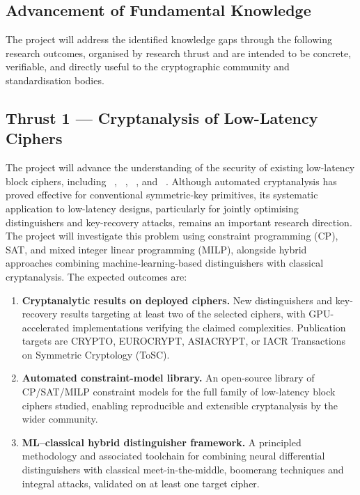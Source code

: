 \subsection{Advancement of Fundamental Knowledge}
The project will address the identified knowledge gaps through the following research outcomes, organised by research thrust and are intended to be concrete, verifiable, and directly useful to the cryptographic community and standardisation bodies.

\subsection*{Thrust 1 — Cryptanalysis of Low-Latency Ciphers}
The project will advance the understanding of the security of existing low-latency block ciphers, including ~\cite{cryptoeprint:2024/1240}, ~\cite{DBLP:conf/eurocrypt/BelkheyarDGLMPRSSAV25}, ~\cite{DBLP:conf/uss/CanaleGLTTU23}, and ~\cite{DBLP:journals/tosc/AvanziBDEGNR23}.
Although automated cryptanalysis has proved effective for conventional symmetric-key primitives, its systematic application to low-latency designs, particularly for jointly optimising distinguishers and key-recovery attacks, remains an important research direction. The project will investigate this problem using constraint programming (CP), SAT, and mixed integer linear programming (MILP), alongside hybrid approaches combining machine-learning-based distinguishers with classical cryptanalysis. The expected outcomes are:


\begin{enumerate}[label=\textbf{D\arabic*.}, leftmargin=*, itemsep=2pt]
  \item \textbf{Cryptanalytic results on deployed ciphers.}
        New distinguishers and key-recovery results targeting at least two of the selected ciphers, with GPU-accelerated implementations verifying the claimed complexities.
        Publication targets are CRYPTO, EUROCRYPT, ASIACRYPT, or IACR Transactions on Symmetric Cryptology (ToSC).

  \item \textbf{Automated constraint-model library.}
        An open-source library of CP/SAT/MILP constraint models for the full family of low-latency block ciphers studied, enabling reproducible and extensible cryptanalysis by the wider community.

  \item \textbf{ML--classical hybrid distinguisher framework.}
        A principled methodology and associated toolchain for combining neural differential distinguishers with classical meet-in-the-middle, boomerang techniques and integral attacks, validated on at least one target cipher.
\end{enumerate}

